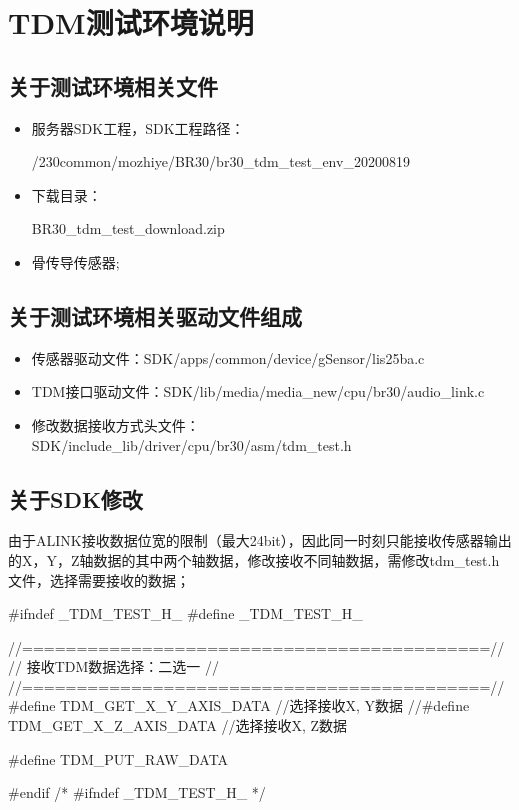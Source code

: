 \section{TDM测试环境说明}
\subsection{关于测试环境相关文件}
\begin{itemize}
\item 服务器SDK工程，SDK工程路径：
\begin{messagebox}
/230common/mozhiye/BR30/br30_tdm_test_env_20200819
\end{messagebox}
\item 下载目录：
\begin{messagebox}
BR30_tdm_test_download.zip
\end{messagebox}
\item 骨传导传感器;
\end{itemize}

\subsection{关于测试环境相关驱动文件组成}
\begin{itemize}
\item 传感器驱动文件：SDK/apps/common/device/gSensor/lis25ba.c
\item TDM接口驱动文件：SDK/lib/media/media\_new/cpu/br30/audio\_link.c
\item 修改数据接收方式头文件：SDK/include\_lib/driver/cpu/br30/asm/tdm\_test.h
\end{itemize}

\subsection{关于SDK修改}
由于ALINK接收数据位宽的限制（最大24bit），因此同一时刻只能接收传感器输出的X，Y，Z轴数据的其中两个轴数据，修改接收不同轴数据，需修改tdm\_test.h文件，选择需要接收的数据；
\begin{myccode}[caption={tdm\_test.h}]
#ifndef _TDM_TEST_H_
#define _TDM_TEST_H_

//===========================================//
//              接收TDM数据选择：二选一      //
//===========================================//
#define TDM_GET_X_Y_AXIS_DATA 		//选择接收X, Y数据
//#define TDM_GET_X_Z_AXIS_DATA     //选择接收X, Z数据

#define TDM_PUT_RAW_DATA

#endif /* #ifndef _TDM_TEST_H_ */
\end{myccode}

